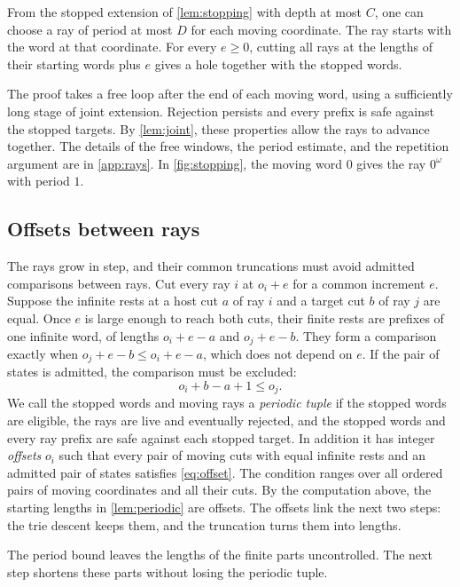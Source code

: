 \begin{lemma}\label{lem:periodic}
From the stopped extension of \cref{lem:stopping} with depth at most $C$,
one can choose a ray of period at most $D$ for each moving coordinate.
The ray starts with the word at that coordinate. For every $e\ge 0$,
cutting all rays at the lengths of their starting words plus $e$ gives a
hole together with the stopped words.
\end{lemma}

The proof takes a free loop after the end of each moving word, using a
sufficiently long stage of joint extension. Rejection persists and every
prefix is safe against the stopped targets. By \cref{lem:joint}, these
properties allow the rays to advance together. The details of the free
windows, the period estimate, and the repetition argument are in
\cref{app:rays}. In \cref{fig:stopping}, the moving word $0$ gives the ray
$0^\omega$ with period $1$.

\subsection{Offsets between rays}
\label{sec:offsets}

The rays grow in step, and their common truncations must avoid admitted
comparisons between rays. Cut every ray $i$ at $o_i+e$ for a common
increment $e$. Suppose the infinite rests at a host cut $a$ of ray $i$ and
a target cut $b$ of ray $j$ are equal. Once $e$ is large enough to reach
both cuts, their finite rests are prefixes of one infinite word, of lengths
$o_i+e-a$ and $o_j+e-b$. They form a comparison exactly when
$o_j+e-b\le o_i+e-a$, which does not depend on $e$. If the pair of states
is admitted, the comparison must be excluded:
\begin{equation}
   o_i+b-a+1\le o_j .
   \label{eq:offset}
\end{equation}
We call the stopped words and moving rays a \emph{periodic tuple} if the
stopped words are eligible, the rays are live and eventually rejected,
and the stopped words and every ray prefix are safe against each stopped
target. In addition it has integer \emph{offsets} $o_i$ such that every
pair of moving cuts with equal infinite rests and an admitted pair of
states satisfies \eqref{eq:offset}. The condition ranges over all ordered
pairs of moving coordinates and all their cuts. By the computation above,
the starting lengths in \cref{lem:periodic} are offsets. The offsets link
the next two steps: the trie descent keeps them, and the truncation turns
them into lengths.

The period bound leaves the lengths of the finite parts uncontrolled.
The next step shortens these parts without losing the periodic tuple.

